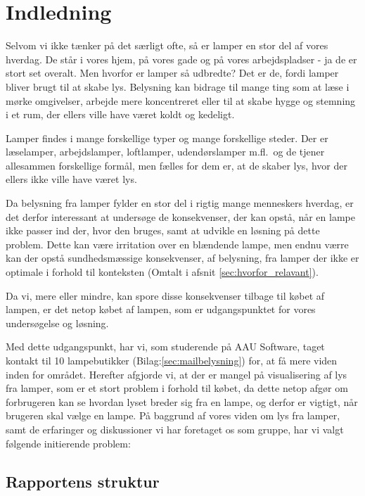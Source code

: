 \section{Indledning}
Selvom vi ikke tænker på det særligt ofte, så er lamper en stor del af vores hverdag. De står i vores hjem, på vores gade og på vores arbejdspladser - ja de er stort set overalt. Men hvorfor er lamper så udbredte? Det er de, fordi lamper bliver brugt til at skabe lys. Belysning kan bidrage til mange ting som at læse i mørke omgivelser, arbejde mere koncentreret eller til at skabe hygge og stemning i et rum, der ellers ville have været koldt og kedeligt. 

Lamper findes i mange forskellige typer og mange forskellige steder. Der er læselamper, arbejdslamper, loftlamper, udendørslamper m.fl.\ og de tjener allesammen forskellige formål, men fælles for dem er, at de skaber lys, hvor der ellers ikke ville have været lys. 

Da belysning fra lamper fylder en stor del i rigtig mange menneskers hverdag, er det derfor interessant at undersøge de konsekvenser, der kan opstå, når en lampe ikke passer ind der, hvor den bruges, samt at udvikle en løsning på dette problem. Dette kan være irritation over en blændende lampe, men endnu værre kan der opstå sundhedsmæssige konsekvenser, af belysning, fra lamper der ikke er optimale i forhold til konteksten (Omtalt i afsnit \ref{sec:hvorfor_relavant}).

Da vi, mere eller mindre, kan spore disse konsekvenser tilbage til købet af lampen, er det netop købet af lampen, som er udgangspunktet for vores undersøgelse og løsning.

Med dette udgangspunkt, har vi, som studerende på AAU Software, taget kontakt til 10 lampebutikker (Bilag:\ref{sec:mailbelysning}) for, at få mere viden inden for området. Herefter afgjorde vi, at der er mangel på visualisering af lys fra lamper, som er et stort problem i forhold til købet, da dette netop afgør om forbrugeren kan se hvordan lyset breder sig fra en lampe, og derfor er vigtigt, når brugeren skal vælge en lampe. På baggrund af vores viden om lys fra lamper, samt de erfaringer og diskussioner vi har foretaget os som gruppe, har vi valgt følgende initierende problem:



\subsection{Rapportens struktur}

